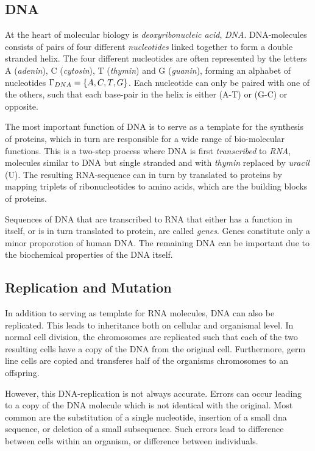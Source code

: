 \subsection{DNA}
At the heart of molecular biology is \emph{deoxyribonucleic acid}, \emph{DNA}.
DNA-molecules consists of pairs of four different \emph{nucleotides} linked together to form a double stranded helix.
The four different nucleotides are often represented by the letters A (\emph{adenin}), C (\emph{cytosin}), T (\emph{thymin}) and G (\emph{guanin}), forming an alphabet of nucleotides $\Gamma_{DNA} = \left\{A, C, T, G\right\}$.
Each nucleotide can only be paired with one of the others, such that each base-pair in the helix is either (A-T) or (G-C) or opposite. 

The most important function of DNA is to serve as a template for the synthesis of proteins, which in turn are responsible for a wide range of bio-molecular functions.
This is a two-step process where DNA is first \emph{transcribed} to \emph{RNA}, molecules similar to DNA but single stranded and with \emph{thymin} replaced by \emph{uracil} (U). The resulting RNA-sequence can in turn by translated to proteins by mapping triplets of ribonucleotides to amino acids, which are the building blocks of proteins.

Sequences of DNA that are transcribed to RNA that either has a function in itself, or is in turn translated to protein, are called \emph{genes}. Genes constitute only a minor proporotion of human DNA. The remaining DNA can be important due to the biochemical properties of the DNA itself. 

\subsection{Replication and Mutation}
In addition to serving as template for RNA molecules, DNA can also be replicated. This leads to inheritance both on cellular and organismal level. In normal cell division, the chromosomes are replicated such that each of the two resulting cells have a copy of the DNA from the original cell. Furthermore, germ line cells are copied and transferes half of the organisms chromosomes to an offspring. 

However, this DNA-replication is not always accurate.
Errors can occur leading to a copy of the DNA molecule which is not identical with the original.
Most common are the substitution of a single nucleotide, insertion of a small dna sequence, or deletion of a small subsequence. Such errors lead to difference between cells within an organism, or difference between individuals.

